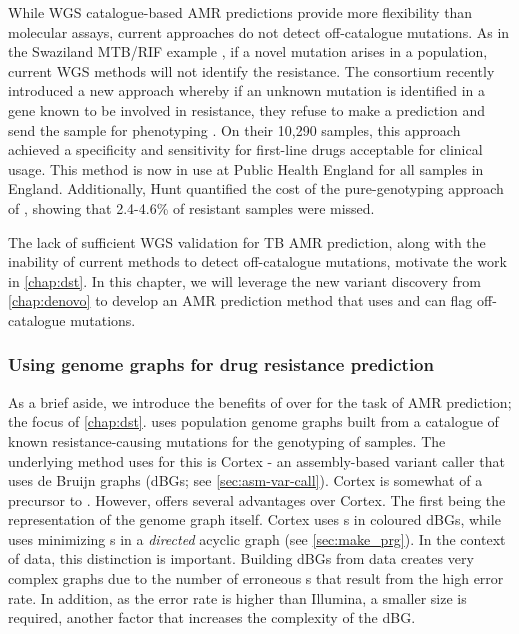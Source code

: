 \noindent
While WGS catalogue-based AMR predictions provide more flexibility than molecular assays, current approaches do not detect off-catalogue mutations. As in the Swaziland \xpert{} MTB/RIF example \cite{Sanchez2015}, if a novel mutation arises in a population, current WGS methods will not identify the resistance. The \cryptic{} consortium recently introduced a new approach whereby if an unknown mutation is identified in a gene known to be involved in resistance, they refuse to make a prediction and send the sample for phenotyping \cite{cryptic2018}. On their 10,290 samples, this approach achieved a specificity and sensitivity for first-line drugs acceptable for clinical usage. This method is now in use at Public Health England for all \mtb{} samples in England. Additionally, Hunt \etal{} quantified the cost of the pure-genotyping approach of \mykrobe{}, showing that 2.4-4.6\% of resistant samples were missed. 

\noindent
The lack of sufficient \ont{} WGS validation for TB AMR prediction, along with the inability of current methods to detect off-catalogue mutations, motivate the work in \autoref{chap:dst}. In this chapter, we will leverage the new \denovo{} variant discovery from \autoref{chap:denovo} to develop an AMR prediction method that uses \pandora{} and can flag off-catalogue mutations.

\subsubsection{Using genome graphs for drug resistance prediction}
\label{sec:genome-graphs-dst}
As a brief aside, we introduce the benefits of \pandora{} over \mykrobe{} for the task of AMR prediction; the focus of \autoref{chap:dst}. \mykrobe{} uses population genome graphs built from a catalogue of known resistance-causing mutations for the genotyping of samples. The underlying method \mykrobe{} uses for this is Cortex \cite{iqbal2012} - an assembly-based variant caller that uses de Bruijn graphs (dBGs; see \autoref{sec:asm-var-call}). Cortex is somewhat of a precursor to \pandora{}. However, \pandora{} offers several advantages over Cortex. The first being the representation of the genome graph itself. Cortex uses \kmer{}s in coloured dBGs, while \pandora{} uses minimizing \kmer{}s in a \emph{directed} acyclic graph (see \autoref{sec:make_prg}). In the context of \ont{} data, this distinction is important. Building dBGs from \ont{} data creates very complex graphs due to the number of erroneous \kmer{}s that result from the high error rate. In addition, as the \ont{} error rate is higher than Illumina, a smaller \kmer{} size is required, another factor that increases the complexity of the dBG. 

